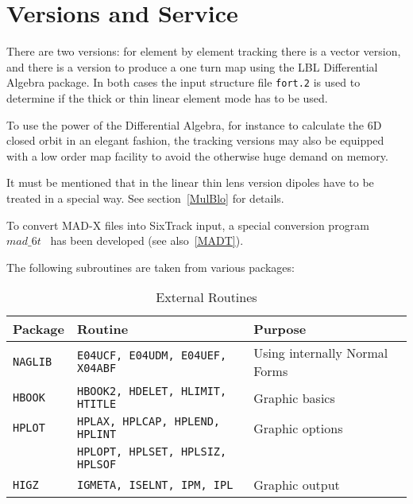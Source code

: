 \section{Versions and Service}

There are two versions: for element by element tracking there is a vector version, and there is a version to produce a one turn map using the LBL Differential Algebra package.
In both cases the input structure file \texttt{fort.2} is used to determine if the thick or thin linear element mode has to be used.

To use the power of the Differential Algebra, for instance to calculate the 6D closed orbit in an elegant fashion, the tracking versions may also be equipped with a low order map facility to avoid the otherwise huge demand on memory.

It must be mentioned that in the linear thin lens version dipoles have to be treated in a special way.
See section~\ref{MulBlo} for details.

To convert MAD-X files into SixTrack input, a special conversion program $mad\_6t$~\cite{CONVERTOR} has been developed (see also~\ref{MADT}).

The following subroutines are taken from various packages:

\begin{table}[h]
    \caption{External Routines}
    \label{T-ExtRou}
    \centering
    \renewcommand{\arraystretch}{1.5}
    \begin{tabular}{|l|l|l|}
        \hline
        \rowcolor{blue!30}
        \textbf{Package} & \textbf{Routine} & \textbf{Purpose} \\
        \hline
        \texttt{NAGLIB} & \texttt{E04UCF, E04UDM, E04UEF, X04ABF} & Using internally Normal Forms \\
        \hline
        \texttt{HBOOK}  & \texttt{HBOOK2, HDELET, HLIMIT, HTITLE} & Graphic basics \\
        \hline
        \texttt{HPLOT}  & \texttt{HPLAX,  HPLCAP, HPLEND, HPLINT} & Graphic options \\
        \cline{2-2}
                        & \texttt{HPLOPT, HPLSET, HPLSIZ, HPLSOF} &  \\
        \hline
        \texttt{HIGZ}   & \texttt{IGMETA, ISELNT, IPM, IPL}       & Graphic output \\
        \hline
    \end{tabular}
\end{table}

